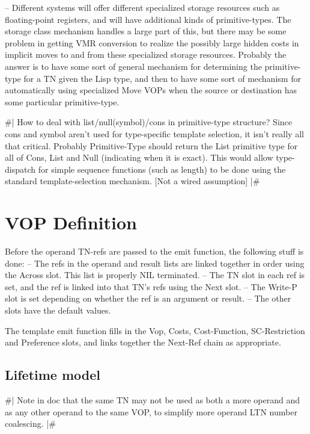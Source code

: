 -- Different systems will offer different specialized storage resources
    such as floating-point registers, and will have additional kinds of
    primitive-types.  The storage class mechanism handles a large part of this,
    but there may be some problem in getting VMR conversion to realize the
    possibly large hidden costs in implicit moves to and from these specialized
    storage resources.  Probably the answer is to have some sort of general
    mechanism for determining the primitive-type for a TN given the Lisp type,
    and then to have some sort of mechanism for automatically using specialized
    Move VOPs when the source or destination has some particular primitive-type.

\#|
How to deal with list/null(symbol)/cons in primitive-type structure?  Since
cons and symbol aren't used for type-specific template selection, it isn't
really all that critical.  Probably Primitive-Type should return the List
primitive type for all of Cons, List and Null (indicating when it is exact).
This would allow type-dispatch for simple sequence functions (such as length)
to be done using the standard template-selection mechanism.  [Not a wired
assumption] 
|\#



\chapter{VOP Definition}

Before the operand TN-refs are passed to the emit function, the following
stuff is done:
 -- The refs in the operand and result lists are linked together in order using
    the Across slot.  This list is properly NIL terminated.
 -- The TN slot in each ref is set, and the ref is linked into that TN's refs
    using the Next slot.
 -- The Write-P slot is set depending on whether the ref is an argument or
    result.
 -- The other slots have the default values.

The template emit function fills in the Vop, Costs, Cost-Function,
SC-Restriction and Preference slots, and links together the Next-Ref chain as
appropriate.


\section{Lifetime model}

\#|
Note in doc that the same TN may not be used as both a more operand and as any
other operand to the same VOP, to simplify more operand LTN number coalescing.
|\#

